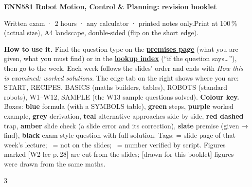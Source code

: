 {\sffamily\bfseries\LARGE ENN581 Robot Motion, Control \& Planning: revision booklet}\par\vspace{2pt}
{\sffamily Written exam · 2 hours · any calculator · printed notes only.\quad Print at 100\,\% (actual size), A4 landscape, double-sided (flip on the short edge).}\par\vspace{3pt}
{\small\textbf{How to use it.} Find the question type on the \hyperref[p:START2]{\textbf{premises page}} (what you are given, what you must find) or in the \hyperref[p:INDEX]{\textbf{lookup index}} (“if the question says…”), then go to the week. Each week follows the slides' order and ends with \emph{How this is examined: worked solutions}. The edge tab on the right shows where you are: START, RECIPES, BASICS (maths builders, tables), ROBOTS (standard robots), W1–W12, SAMPLE (the W13 sample questions solved).
\textbf{Colour key.} Boxes: \textcolor{fblue}{\textbf{blue}} formula (with a SYMBOLS table), \textcolor{rgreen}{\textbf{green}} steps, \textcolor{wpurple}{\textbf{purple}} worked example, \textcolor{dgrey}{\textbf{grey}} derivation, \textcolor{alteal}{\textbf{teal}} alternative approaches side by side, \textcolor{tred}{\textbf{red dashed}} trap, \textcolor{samber}{\textbf{amber}} slide check (a slide error and its correction), \textcolor{slate}{\textbf{slate}} premise (given → find), \textbf{black} exam-style question with full solution. Tags:  = slide page of that week's lecture; \added\ = not on the slides; \chk\ = number verified by script. Figures marked [W2 lec p.\,28] are cut from the slides; [drawn for this booklet] figures were drawn from the same maths.\par}
\vspace{2pt}
\begin{multicols}{3}
\footnotesize
\makeatletter{}\makeatother
\end{multicols}
